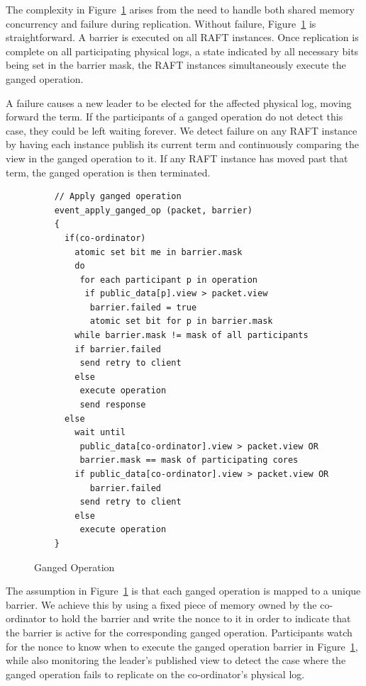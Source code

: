 \documentclass[twocolumn]{article}
\begin{document}
The complexity in Figure~\ref{fig:ganged_ops} arises from the need to handle
both shared memory concurrency and failure during replication. Without failure,
Figure~\ref{fig:ganged_ops} is straightforward. A barrier is executed on all
RAFT instances. Once replication is complete on all participating physical logs,
a state indicated by all necessary bits being set in the barrier mask, the RAFT
instances simultaneously execute the ganged operation.

A failure causes a new leader to be elected for the affected physical log,
moving forward the term. If the participants of a ganged operation do not
detect this case, they could be left waiting forever. We detect failure on any
RAFT instance by having each instance publish its current term and continuously
comparing the view in the ganged operation to it. If any RAFT instance has moved
past that term, the ganged operation is then terminated.

\begin{figure}
  \centering
  \small
  \bf
\begin{verbatim}
    // Apply ganged operation
    event_apply_ganged_op (packet, barrier)
    {
      if(co-ordinator)
        atomic set bit me in barrier.mask         
        do
         for each participant p in operation
          if public_data[p].view > packet.view
           barrier.failed = true 
           atomic set bit for p in barrier.mask
        while barrier.mask != mask of all participants
        if barrier.failed
         send retry to client
        else       
         execute operation
         send response
      else
        wait until 
         public_data[co-ordinator].view > packet.view OR
         barrier.mask == mask of participating cores
        if public_data[co-ordinator].view > packet.view OR
           barrier.failed
         send retry to client
        else
         execute operation
    }
\end{verbatim}
\caption{Ganged Operation}
\label{fig:ganged_ops}
\end{figure}

The assumption in Figure~\ref{fig:ganged_ops} is that each ganged operation is
mapped to a unique barrier. We achieve this by using a fixed piece of memory
owned by the co-ordinator to hold the barrier and write the nonce to it in order
to indicate that the barrier is active for the corresponding ganged
operation. Participants watch for the nonce to know when to execute the
ganged operation barrier in Figure~\ref{fig:ganged_ops}, while also monitoring
the leader's published view to detect the case where the ganged operation fails
to replicate on the co-ordinator's physical log.
\end{document}
